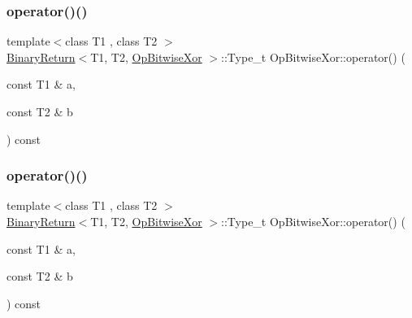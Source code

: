 \subsubsection{\texorpdfstring{operator()()}{operator()()}\hspace{0.1cm}{\footnotesize\ttfamily [1/3]}}
{\footnotesize\ttfamily template$<$class T1 , class T2 $>$ \\
\mbox{\hyperlink{structBinaryReturn}{Binary\+Return}}$<$T1, T2, \mbox{\hyperlink{structOpBitwiseXor}{Op\+Bitwise\+Xor}} $>$\+::Type\+\_\+t Op\+Bitwise\+Xor\+::operator() (\begin{DoxyParamCaption}\item[{const T1 \&}]{a,  }\item[{const T2 \&}]{b }\end{DoxyParamCaption}) const\hspace{0.3cm}{\ttfamily [inline]}}

\mbox{\label{structOpBitwiseXor_af0ce6a043ad61e902b5303b11a36ce4b}} 
\subsubsection{\texorpdfstring{operator()()}{operator()()}\hspace{0.1cm}{\footnotesize\ttfamily [2/3]}}
{\footnotesize\ttfamily template$<$class T1 , class T2 $>$ \\
\mbox{\hyperlink{structBinaryReturn}{Binary\+Return}}$<$T1, T2, \mbox{\hyperlink{structOpBitwiseXor}{Op\+Bitwise\+Xor}} $>$\+::Type\+\_\+t Op\+Bitwise\+Xor\+::operator() (\begin{DoxyParamCaption}\item[{const T1 \&}]{a,  }\item[{const T2 \&}]{b }\end{DoxyParamCaption}) const\hspace{0.3cm}{\ttfamily [inline]}}

\mbox{\label{structOpBitwiseXor_af0ce6a043ad61e902b5303b11a36ce4b}} 
